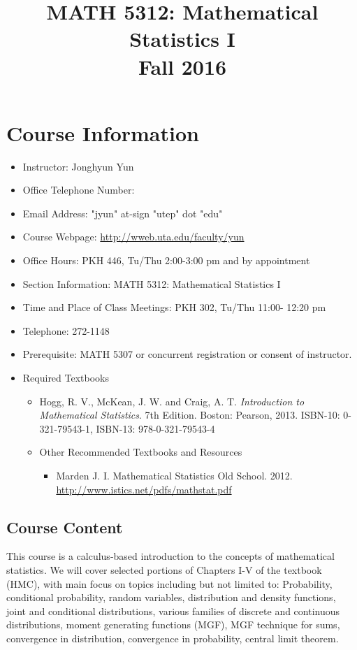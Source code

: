 \documentclass[10pt]{article}
\date{}
\title{MATH 5312: Mathematical Statistics I\\\medskip
\large Fall 2016}
\begin{document}
\maketitle


\section*{Course Information}
\label{sec:orgheadline4}
\begin{itemize}
\item Instructor: Jonghyun Yun
\item Office Telephone Number:
\item Email Address: "jyun" at-sign "utep" dot "edu"

\item Course Webpage: \url{http://wweb.uta.edu/faculty/yun}
\item Office Hours: PKH 446, Tu/Thu 2:00-3:00 pm and by appointment

\item Section Information: MATH 5312: Mathematical Statistics I
\item Time and Place of Class Meetings: PKH 302, Tu/Thu 11:00- 12:20 pm
\item Telephone: 272-1148
\item Prerequisite: MATH 5307 or concurrent registration or consent of instructor.
\item Required Textbooks
\begin{itemize}
\item Hogg, R. V., McKean, J. W. and Craig, A. T. \emph{Introduction to Mathematical Statistics}. 7th Edition. Boston: Pearson, 2013. ISBN-10: 0-321-79543-1, ISBN-13: 978-0-321-79543-4
\item Other Recommended Textbooks and Resources
\begin{itemize}
\item Marden J. I. Mathematical Statistics Old School. 2012. \href{http://www.istics.net/pdfs/mathstat.pdf}{\url{http://www.istics.net/pdfs/mathstat.pdf}}
\end{itemize}
\end{itemize}
\end{itemize}
\subsection*{Course Content}
\label{sec:orgheadline1}
This course is a calculus-based introduction to the concepts of mathematical statistics.
We will cover selected portions of Chapters I-V of the textbook (HMC), with main focus on topics including but not limited to: Probability, conditional probability, random variables, distribution and density functions, joint and conditional distributions, various families of discrete and continuous distributions, moment generating functions (MGF), MGF technique for sums, convergence in distribution, convergence in probability, central limit theorem.
\end{document}
